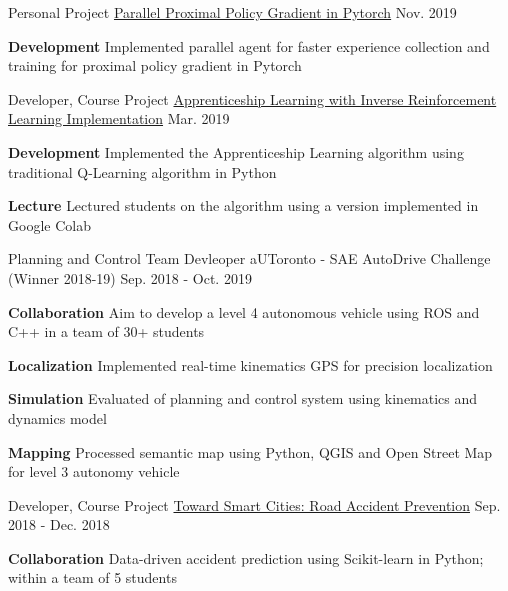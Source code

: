 \begin{cventries}
	\cventry
	{Personal Project}
	{\href{https://github.com/rhklite/Parallel-PPO-PyTorch}{Parallel Proximal Policy Gradient in Pytorch}}
	{Nov. 2019}
	{}
	{
		\begin{cvitems}
			\item {\textbf{Development} Implemented parallel agent for faster experience collection and training for proximal policy gradient in Pytorch}
		\end{cvitems}
	}
	\cventry
	{Developer, Course Project}
	{\href{https://github.com/rhklite/apprenticeship_inverse_RL}{Apprenticeship Learning with Inverse Reinforcement Learning Implementation}}
	{Mar. 2019}
	{}
	{
		\begin{cvitems}
			\item {\textbf{Development} {Implemented the Apprenticeship Learning algorithm using traditional Q-Learning algorithm in Python}}
			\item {\textbf{Lecture} {Lectured students on the algorithm using a version implemented in Google Colab}}
		\end{cvitems}
	}
	\cventry
	{Planning and Control Team Devleoper}
	{aUToronto - SAE AutoDrive Challenge (Winner 2018-19)}
	{Sep. 2018 - Oct. 2019}
	{}
	{
		\begin{cvitems}
			\item {\textbf{Collaboration} Aim to develop a level 4 autonomous vehicle using ROS and C++ in a team of 30+ students}
			\item {\textbf{Localization} Implemented real-time kinematics GPS for precision localization
			}
			\item {\textbf{Simulation} Evaluated of planning and control system using kinematics and dynamics model
			}
			\item {\textbf{Mapping} Processed semantic map using Python, QGIS and Open Street Map for level 3 autonomy vehicle}
		\end{cvitems}
	}
	\cventry
	{Developer, Course Project}
	{\href{https://github.com/rhklite/traffic_accident_prediction}{Toward Smart Cities: Road Accident Prevention}}
	{Sep. 2018 - Dec. 2018}
	{}
	{
		\begin{cvitems}
			\item {\textbf{Collaboration} Data-driven accident prediction using Scikit-learn in Python; within a team of 5 students}

\end{cvitems}}
\end{cventries}
